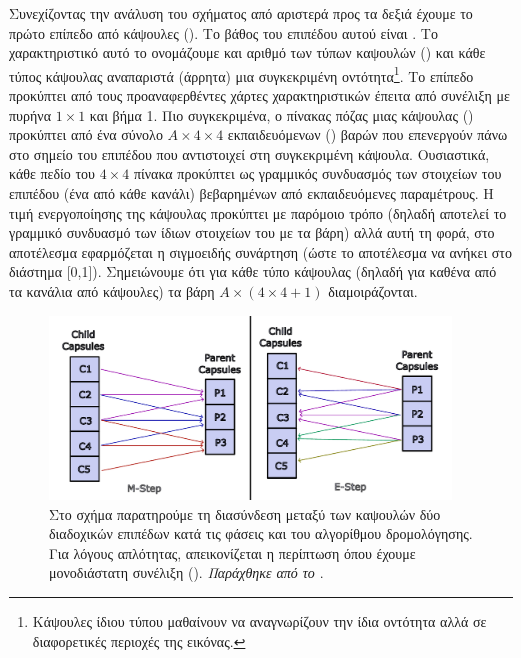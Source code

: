 Συνεχίζοντας την ανάλυση του σχήματος από αριστερά προς τα δεξιά έχουμε το πρώτο επίπεδο από κάψουλες (). Το βάθος του επιπέδου αυτού είναι . Το χαρακτηριστικό αυτό το ονομάζουμε και αριθμό των τύπων καψουλών () και κάθε τύπος κάψουλας αναπαριστά (άρρητα) μια συγκεκριμένη οντότητα\footnote{Κάψουλες ίδιου τύπου μαθαίνουν να αναγνωρίζουν την ίδια οντότητα αλλά σε διαφορετικές περιοχές της εικόνας.}. Το επίπεδο  προκύπτει από τους προαναφερθέντες χάρτες χαρακτηριστικών έπειτα από συνέλιξη με πυρήνα $1 \times 1$ και βήμα 1. Πιο συγκεκριμένα, ο πίνακας πόζας μιας κάψουλας () προκύπτει από ένα σύνολο $ A \times 4 \times 4$ εκπαιδευόμενων () βαρών που επενεργούν πάνω στο σημείο του επιπέδου  που αντιστοιχεί στη συγκεκριμένη κάψουλα. Ουσιαστικά, κάθε πεδίο του $4 \times 4$ πίνακα προκύπτει ως γραμμικός συνδυασμός των  στοιχείων του επιπέδου  (ένα από κάθε κανάλι) βεβαρημένων από  εκπαιδευόμενες παραμέτρους. Η τιμή ενεργοποίησης της κάψουλας προκύπτει με παρόμοιο τρόπο (δηλαδή αποτελεί το γραμμικό συνδυασμό των ίδιων  στοιχείων του  με τα  βάρη) αλλά αυτή τη φορά, στο αποτέλεσμα εφαρμόζεται η σιγμοειδής συνάρτηση (ώστε το αποτέλεσμα να ανήκει στο διάστημα [0,1]). Σημειώνουμε ότι για κάθε τύπο κάψουλας (δηλαδή για καθένα από τα  κανάλια από κάψουλες) τα βάρη $ A \times (4 \times 4 + 1) $ διαμοιράζονται.\par

\begin{figure}[h]
  \centering
  \includegraphics[width=0.95\textwidth]{images/chapter method/second_method_EM.pdf}
  \caption{Στο σχήμα παρατηρούμε τη διασύνδεση μεταξύ των καψουλών δύο διαδοχικών επιπέδων κατά τις φάσεις  και  του αλγορίθμου δρομολόγησης. Για λόγους απλότητας, απεικονίζεται η περίπτωση όπου έχουμε μονοδιάστατη συνέλιξη (). \textit{Παράχθηκε από το \href{https://inkscape.org/}{}}.}
  \label{fig:method_2_EM}
\end{figure}

